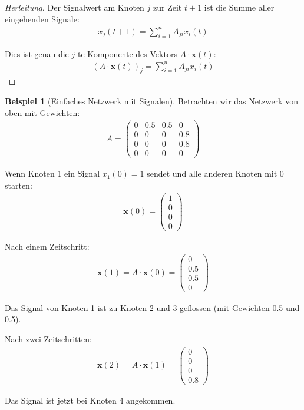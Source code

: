 ﻿\documentclass[a4paper,12pt]{report}
\theoremstyle{definition}
\newtheorem{beispiel}{Beispiel}
\begin{document}
	\begin{proof}[Herleitung]
		Der Signalwert am Knoten $j$ zur Zeit $t+1$ ist die Summe aller eingehenden Signale:
		\begin{align}
			x_j(t+1) = \sum_{i=1}^{n} A_{ji} x_i(t)
		\end{align}
		
		Dies ist genau die $j$-te Komponente des Vektors $A \cdot \mathbf{x}(t)$:
		\begin{align}
			(A \cdot \mathbf{x}(t))_j = \sum_{i=1}^{n} A_{ji} x_i(t)
		\end{align}
	\end{proof}
	
	\begin{beispiel}[Einfaches Netzwerk mit Signalen]
		Betrachten wir das Netzwerk von oben mit Gewichten:
		\begin{align}
			A = \begin{pmatrix} 0 & 0.5 & 0.5 & 0 \\ 0 & 0 & 0 & 0.8 \\ 0 & 0 & 0 & 0.8 \\ 0 & 0 & 0 & 0 \end{pmatrix}
		\end{align}
		
		Wenn Knoten 1 ein Signal $x_1(0) = 1$ sendet und alle anderen Knoten mit 0 starten:
		\begin{align}
			\mathbf{x}(0) = \begin{pmatrix} 1 \\ 0 \\ 0 \\ 0 \end{pmatrix}
		\end{align}
		
		Nach einem Zeitschritt:
		\begin{align}
			\mathbf{x}(1) = A \cdot \mathbf{x}(0) = \begin{pmatrix} 0 \\ 0.5 \\ 0.5 \\ 0 \end{pmatrix}
		\end{align}
		
		Das Signal von Knoten 1 ist zu Knoten 2 und 3 geflossen (mit Gewichten 0.5 und 0.5).
		
		Nach zwei Zeitschritten:
		\begin{align}
			\mathbf{x}(2) = A \cdot \mathbf{x}(1) = \begin{pmatrix} 0 \\ 0 \\ 0 \\ 0.8 \end{pmatrix}
		\end{align}
		
		Das Signal ist jetzt bei Knoten 4 angekommen.
	\end{beispiel}
	
\end{document}
